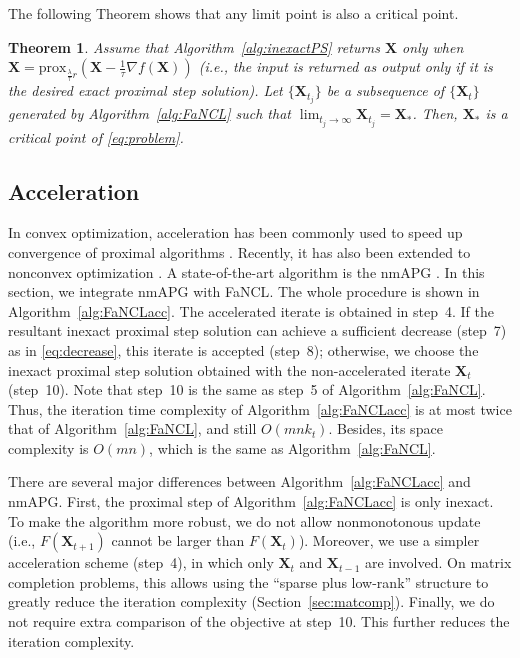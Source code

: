 \documentclass[10pt,journal,compsoc]{IEEEtran}
\newtheorem{theorem}{Theorem}[section]
\newcommand{\X}{\mathbf{X}}
\newcommand{\Prox}[2]{\text{prox}_{#1}(#2)}
\begin{document}
The following Theorem shows  that
any limit point is also a critical point.

\begin{theorem} \label{the:FaNCL:conv}
Assume that Algorithm~\ref{alg:inexactPS} returns $\mathbf{X}$ only when 
$\mathbf{X} = \Prox{\frac{\lambda}{\tau} r}{\mathbf{X} - \frac{1}{\tau} \nabla
f(\mathbf{X})}$ (i.e.,
the input is 
returned
as output only if  it
is the desired exact proximal step solution).
Let $\{ \X_{t_j} \}$ be
a subsequence of $\{ \X_t \}$ generated by Algorithm~\ref{alg:FaNCL} such that
$\lim_{t_j \rightarrow \infty} \X_{t_j} = \X_*$.
Then, $\X_*$ is a critical point of \eqref{eq:problem}.
\end{theorem}




\subsection{Acceleration}
\label{sec:accFaNCL}

In convex optimization, acceleration has been commonly used to speed up convergence
of proximal algorithms \cite{beck2009fast}.  
Recently, it has also been extended to nonconvex optimization \cite{li2015accelerated,ghadimi2016accelerated}.
A state-of-the-art algorithm is the \textsf{nmAPG} \cite{li2015accelerated}.
In this section, we integrate \textsf{nmAPG} with \textsf{FaNCL}. The whole procedure
is shown in Algorithm~\ref{alg:FaNCLacc}.
The accelerated iterate is obtained in step~4.
If the resultant inexact proximal step solution can achieve a sufficient decrease (step~7)
as in \eqref{eq:decrease},
this iterate is accepted (step~8);
otherwise,
we 
choose the inexact proximal step solution obtained with the non-accelerated iterate
$\mathbf{X}_t$ (step~10).
Note that step~10 
is the same as step~5 of Algorithm~\ref{alg:FaNCL}.
Thus, the iteration time complexity of Algorithm~\ref{alg:FaNCLacc} is at most twice that of Algorithm~\ref{alg:FaNCL}, and still $O(m n k_t)$.  
Besides, its space complexity is $O(m n)$, 
which is the same as Algorithm~\ref{alg:FaNCL}.

There are several major differences between Algorithm~\ref{alg:FaNCLacc} and \textsf{nmAPG}.  First, the proximal step of Algorithm~\ref{alg:FaNCLacc} is only inexact.
To make the algorithm more robust, we do not allow nonmonotonous update (i.e., $F(\X_{t +
1})$ cannot be larger than $F(\X_t)$).
Moreover, we use a simpler acceleration scheme (step~4), in which only $\X_t$ and $\X_{t - 1}$ are involved.  
On matrix completion problems,
this allows using the ``sparse plus low-rank'' structure
\cite{mazumder2010spectral} to greatly reduce the iteration complexity
(Section~\ref{sec:matcomp}).  Finally, we do not require extra comparison of the objective at step~10. This further reduces the iteration complexity.
\end{document}
